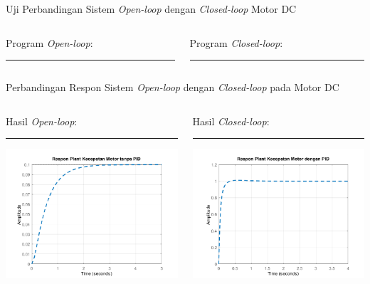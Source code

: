 \documentclass[10pt,xcolor={dvipsnames}]{beamer}
\begin{document}
\begin{frame}{Uji Perbandingan Sistem \textit{Open-loop} dengan \textit{Closed-loop} Motor DC}
	\begin{columns}[T] %
		\begin{column}{0.48\textwidth}
			Program \textit{Open-loop}:
			\color{black}\rule{\linewidth}{4pt}
			
		\end{column}%
		\hfill%
		\begin{column}{0.48\textwidth}
			Program \textit{Closed-loop}:
			\color{blue}\rule{\linewidth}{4pt}
			
		\end{column}
	\end{columns}
\end{frame}	
\begin{frame}{Perbandingan Respon Sistem \textit{Open-loop} dengan \textit{Closed-loop} pada Motor DC}
	\begin{columns}[T] %
		\begin{column}{0.48\textwidth}
			Hasil \textit{Open-loop}:\newline
			\color{black}\rule{\linewidth}{4pt}
			\includegraphics[width=7.5cm]{Matlab/olDCSpeed.png}
		\end{column}%
		\hfill%
		\begin{column}{0.48\textwidth}
			Hasil \textit{Closed-loop}:\newline
			\color{blue}\rule{\linewidth}{4pt}
			\includegraphics[width=7.5cm]{Matlab/clDCSpeed.png}
		\end{column}
	\end{columns}
\end{frame}		
\end{document}
